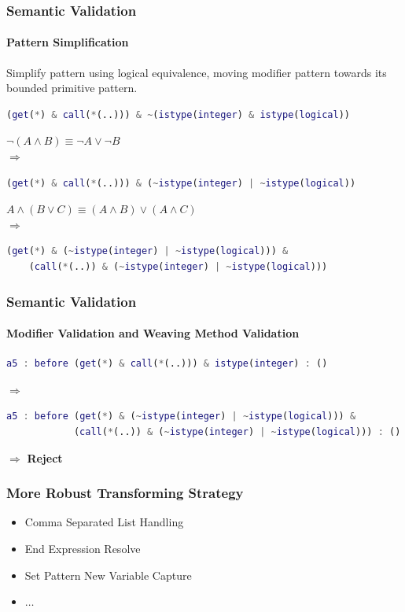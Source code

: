 \documentclass[10pt]{beamer}
\begin{document}
\begin{frame}[fragile]
\frametitle{Semantic Validation}
\framesubtitle{Pattern Simplification}
Simplify pattern using logical equivalence, moving modifier pattern towards
its bounded primitive pattern.

\begin{lstlisting}[basicstyle=\small, language=MATLAB]
(get(*) & call(*(..))) & ~(istype(integer) & istype(logical))
\end{lstlisting}
$\neg (A \land B) \equiv \neg A \lor \neg B$                                 \\
$\Rightarrow$
\begin{lstlisting}[basicstyle=\small, language=MATLAB]
(get(*) & call(*(..))) & (~istype(integer) | ~istype(logical))
\end{lstlisting}
$A \land (B \lor C) \equiv (A \land B) \lor (A \land C)$                     \\
$\Rightarrow$
\begin{lstlisting}[basicstyle=\small, language=MATLAB]
(get(*) & (~istype(integer) | ~istype(logical))) & 
    (call(*(..)) & (~istype(integer) | ~istype(logical)))
\end{lstlisting}

\end{frame}

\begin{frame}[fragile]
\frametitle{Semantic Validation}
\framesubtitle{Modifier Validation and Weaving Method Validation}


\begin{lstlisting}[basicstyle=\small, language=MATLAB]
a5 : before (get(*) & call(*(..))) & istype(integer) : ()
\end{lstlisting}
$\Rightarrow$
\begin{lstlisting}[basicstyle=\small, language=MATLAB]
a5 : before (get(*) & (~istype(integer) | ~istype(logical))) & 
            (call(*(..)) & (~istype(integer) | ~istype(logical))) : ()
\end{lstlisting}
$\Rightarrow$
\textbf{Reject}
\end{frame}

\begin{frame}
\frametitle{More Robust Transforming Strategy}
\begin{itemize}
    \item Comma Separated List Handling 
    \item End Expression Resolve
    \item Set Pattern New Variable Capture
    \item $\dots$
\end{itemize}
\end{frame}
\end{document}
